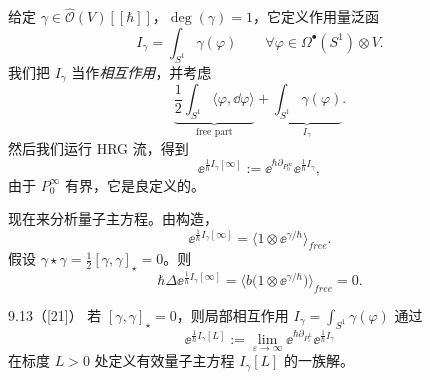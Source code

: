 给定 $\gamma\in\widehat{\mathcal{O}}(V)[[\hbar]]$，$\deg(\gamma)=1$，它定义作用量泛函
\[
  I_{\gamma}=\int_{S^{1}}\gamma(\varphi)
  \qquad\forall\varphi\in\Omega^{\bullet}(S^{1})\otimes V.
\]
我们把 $I_{\gamma}$ 当作\emph{相互作用}，并考虑
\[
  \underbrace{\frac12\int_{S^{1}}\langle\varphi,\dd\varphi\rangle}_{\text{free part}}
  +\underbrace{\int_{S^{1}}\gamma(\varphi)}_{I_{\gamma}}.
\]
然后我们运行 HRG 流，得到
\[
  \ee^{\frac{1}{\hbar}I_{\gamma}[\infty]}
  :=\ee^{\hbar\partial_{P^{\infty}_{0}}}\ee^{\frac{1}{\hbar}I_{\gamma}},
\]
由于 $P^{\infty}_{0}$ 有界，它是良定义的。

现在来分析量子主方程。由构造，
\[
  \ee^{\frac{1}{\hbar}I_{\gamma}[\infty]}
  =\Big\langle1\otimes\ee^{\gamma/\hbar}\Big\rangle_{free}.
\]
假设 $\gamma\star\gamma=\frac12[\gamma,\gamma]_{\star}=0$。则
\[
  \hbar\Delta\ee^{\frac{1}{\hbar}I_{\gamma}[\infty]}
  =\Big\langle b\big(1\otimes\ee^{\gamma/\hbar}\big)\Big\rangle_{free}=0.
\]

\begin{wprop}{9.13}（\textup{[21]}）
  若 $[\gamma,\gamma]_{\star}=0$，则局部相互作用
  $I_{\gamma}=\int_{S^{1}}\gamma(\varphi)$ 通过
  \[
    \ee^{\frac{1}{\hbar}I_{\gamma}[L]}
    :=\lim_{\varepsilon\to\infty}\ee^{\hbar\partial_{P^{L}_{\varepsilon}}}
    \ee^{\frac{1}{\hbar}I_{\gamma}}
  \]
  在标度 $L>0$ 处定义有效量子主方程 $I_{\gamma}[L]$ 的一族解。
\end{wprop}

